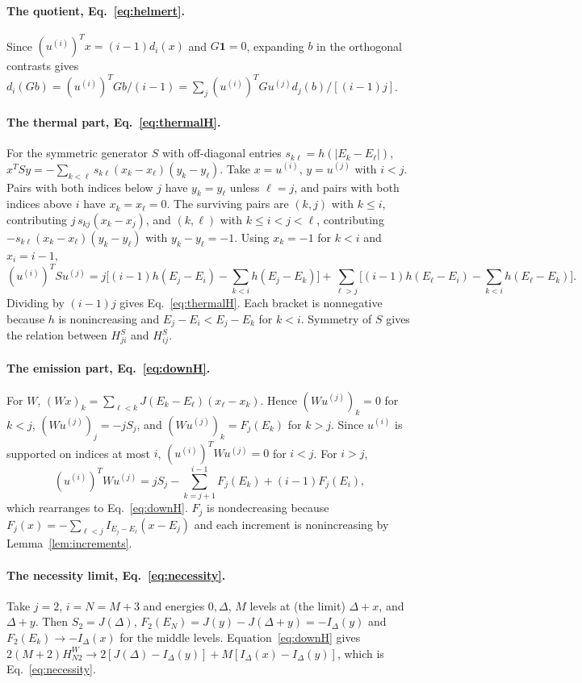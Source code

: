\documentclass[11pt,a4paper]{article}
\theoremstyle{remark}\newtheorem{remark}[theorem]{Remark}
\newcommand{\one}{\mathbf 1}
\begin{document}
\paragraph{The quotient, Eq.~\eqref{eq:helmert}.} Since $(u^{(i)})^Tx=(i-1)d_i(x)$ and $G\one=0$, expanding $b$ in the orthogonal contrasts gives $d_i(Gb)=(u^{(i)})^TGb/(i-1)=\sum_j(u^{(i)})^TGu^{(j)}d_j(b)/[(i-1)j]$.

\paragraph{The thermal part, Eq.~\eqref{eq:thermalH}.} For the symmetric generator $S$ with off-diagonal entries $s_{k\ell}=h(|E_k-E_\ell|)$, $x^TSy=-\sum_{k<\ell}s_{k\ell}(x_k-x_\ell)(y_k-y_\ell)$. Take $x=u^{(i)}$, $y=u^{(j)}$ with $i<j$. Pairs with both indices below $j$ have $y_k=y_\ell$ unless $\ell=j$, and pairs with both indices above $i$ have $x_k=x_\ell=0$. The surviving pairs are $(k,j)$ with $k\le i$, contributing $j\,s_{kj}(x_k-x_j)$, and $(k,\ell)$ with $k\le i<j<\ell$, contributing $-s_{k\ell}(x_k-x_\ell)(y_k-y_\ell)$ with $y_k-y_\ell=-1$. Using $x_k=-1$ for $k<i$ and $x_i=i-1$,
\begin{equation}
 (u^{(i)})^TSu^{(j)}=j\Big[(i-1)h(E_j-E_i)-\sum_{k<i}h(E_j-E_k)\Big]+\sum_{\ell>j}\Big[(i-1)h(E_\ell-E_i)-\sum_{k<i}h(E_\ell-E_k)\Big].
\end{equation}
Dividing by $(i-1)j$ gives Eq.~\eqref{eq:thermalH}. Each bracket is nonnegative because $h$ is nonincreasing and $E_j-E_i<E_j-E_k$ for $k<i$. Symmetry of $S$ gives the relation between $H^S_{ji}$ and $H^S_{ij}$.

\paragraph{The emission part, Eq.~\eqref{eq:downH}.} For $W$, $(Wx)_k=\sum_{\ell<k}J(E_k-E_\ell)(x_\ell-x_k)$. Hence $(Wu^{(j)})_k=0$ for $k<j$, $(Wu^{(j)})_j=-jS_j$, and $(Wu^{(j)})_k=F_j(E_k)$ for $k>j$. Since $u^{(i)}$ is supported on indices at most $i$, $(u^{(i)})^TWu^{(j)}=0$ for $i<j$. For $i>j$,
\begin{equation}
 (u^{(i)})^TWu^{(j)}=jS_j-\sum_{k=j+1}^{i-1}F_j(E_k)+(i-1)F_j(E_i),
\end{equation}
which rearranges to Eq.~\eqref{eq:downH}. $F_j$ is nondecreasing because $F_j(x)=-\sum_{\ell<j}I_{E_j-E_\ell}(x-E_j)$ and each increment is nonincreasing by Lemma~\ref{lem:increments}.

\paragraph{The necessity limit, Eq.~\eqref{eq:necessity}.} Take $j=2$, $i=N=M+3$ and energies $0,\Delta$, $M$ levels at (the limit) $\Delta+x$, and $\Delta+y$. Then $S_2=J(\Delta)$, $F_2(E_N)=J(y)-J(\Delta+y)=-I_\Delta(y)$ and $F_2(E_k)\to-I_\Delta(x)$ for the middle levels. Equation~\eqref{eq:downH} gives $2(M+2)H^W_{N2}\to2[J(\Delta)-I_\Delta(y)]+M[I_\Delta(x)-I_\Delta(y)]$, which is Eq.~\eqref{eq:necessity}.
\end{document}
